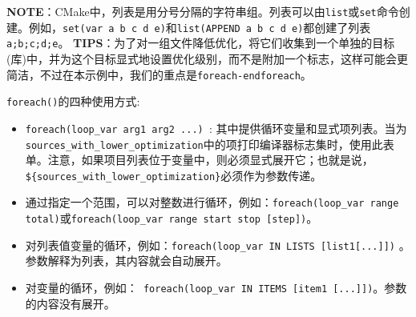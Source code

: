 \begin{myInfoBox}
\textbf{NOTE}：CMake中，列表是用分号分隔的字符串组。列表可以由\texttt{list}或\texttt{set}命令创建。例如，\texttt{set(var a b c d e)}和\texttt{list(APPEND a b c d e)}都创建了列表\texttt{a;b;c;d;e}。 \textbf{TIPS}：为了对一组文件降低优化，将它们收集到一个单独的目标(库)中，并为这个目标显式地设置优化级别，而不是附加一个标志，这样可能会更简洁，不过在本示例中，我们的重点是\texttt{foreach-endforeach}。
\end{myInfoBox}


\texttt{foreach()}的四种使用方式:

\begin{itemize}
\item \texttt{foreach(loop\_var arg1 arg2 ...) }: 其中提供循环变量和显式项列表。当为\texttt{sources\_with\_lower\_optimization}中的项打印编译器标志集时，使用此表单。注意，如果项目列表位于变量中，则必须显式展开它；也就是说，\texttt{\$\{sources\_with\_lower\_optimization\}}必须作为参数传递。

\item 通过指定一个范围，可以对整数进行循环，例如：\texttt{foreach(loop\_var range total)}或\texttt{foreach(loop\_var range start stop [step])}。

\item 对列表值变量的循环，例如：\texttt{foreach(loop\_var IN LISTS [list1[...]])} 。参数解释为列表，其内容就会自动展开。

\item 对变量的循环，例如：\texttt{ foreach(loop\_var IN ITEMS [item1 [...]])}。参数的内容没有展开。

\end{itemize}


